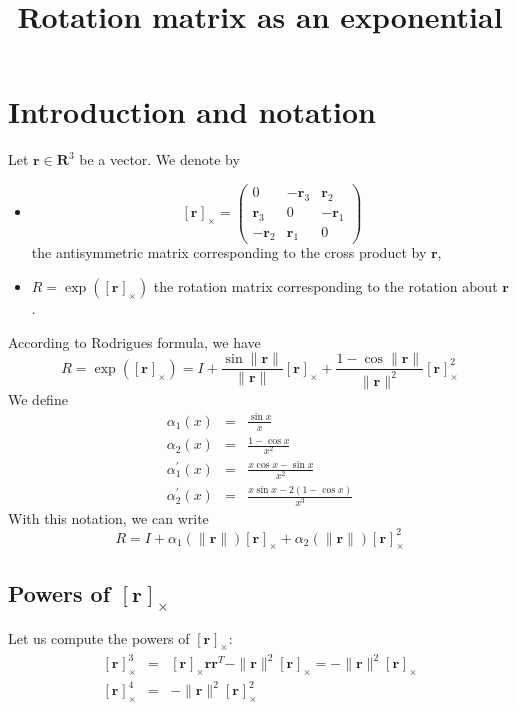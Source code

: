 \documentclass {article}
\title {Rotation matrix as an exponential}
\newcommand\reals{\mathbf{R}}
\newcommand\rot{\mathbf{r}}
\newcommand\rcross[1]{[\rot_{#1}]_{\times}}
\newcommand\normr{\|\rot\|}
\newcommand\alphap{\alpha^{\prime}}
\begin{document}
\maketitle

\section {Introduction and notation}

Let $\rot\in\reals^3$ be a vector. We denote by
\begin{itemize}
\item $$
\rcross{} = \left(\begin{array}{ccc}
0 & -\rot_3 & \rot_2 \\
\rot_3 & 0 & -\rot_1 \\
-\rot_2 & \rot_1 & 0
\end{array}\right)
$$
the antisymmetric matrix corresponding to the cross product by $\rot$,
\item $R = \exp (\rcross{})$ the rotation matrix corresponding to the rotation about
$\rot$.
\end{itemize}
According to Rodrigues formula, we have
\begin{equation}\label{eq:rodrigues}
R = \exp (\rcross{}) = I + \frac{\sin \normr}{\normr}\rcross{} +
\frac{1 - \cos \normr}{\normr^2}\rcross{}^2
\end{equation}
We define
\begin{eqnarray}
\label{eq:alpha1}
\alpha_1 (x) &=& \frac{\sin x}{x}\\
\label{eq:alpha2}
\alpha_2 (x) &=& \frac{1 - \cos x}{x^2}\\
\label{eq:alpha3}
\alphap_1 (x) &=& \frac{x \cos x - \sin x}{x^2}\\
\label{eq:alpha4}
\alphap_2 (x) &=& \frac{x \sin x -2(1-\cos x)}{x^3}
\end{eqnarray}
With this notation, we can write
\begin{equation}\label{eq:rodrigues2}
R = I + \alpha_1 (\normr) \rcross{} + \alpha_2 (\normr) \rcross{}^2
\end{equation}
\subsection {Powers of $\rcross{}$}

Let us compute the powers of $\rcross{}$:
\begin{eqnarray}
\label{eq:rcross2}
\rcross{}^3 &=& \rcross{}\rot\rot^T - \normr^2 \rcross{} = - \normr^2 \rcross{}\\
\label{eq:rcross3}
\rcross{}^4 &=& - \normr^2 \rcross{}^2
\end{eqnarray}
\end{document}
